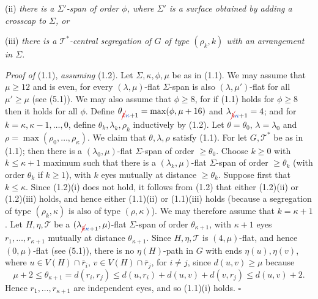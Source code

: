 \hspace*{12pt}(ii) \textit{there is a $\Sigma'$-span of order $\phi$, where $\Sigma'$ is a surface obtained by adding a crosscap to $\Sigma$, or}

\hspace*{12pt}(iii) \textit{there is a $\mathscr{T}^*$-central segregation of $G$ of type $(\rho_k, k)$ with an arrangement in $\Sigma$.}

\textit{Proof of} (1.1), \textit{assuming} (1.2). Let $\Sigma, \kappa, \phi, \mu$ be as in (1.1). We may assume that $\mu \ge 12$ and is even, for every $(\lambda, \mu)$-flat $\Sigma$-span is also $(\lambda, \mu')$-flat for all $\mu' \ge \mu$ (see (5.1)). We may also assume that $\phi \ge 8$, for if (1.1) holds for $\phi \ge 8$ then it holds for all $\phi$. Define $\theta_{\delm{k}\fix{\kappa}+1} = \max(\phi, \mu+16)$ and $\lambda_{\delm{k}\fix{\kappa}+1} = 4$; and for $k = \kappa, \kappa-1, \dots, 0$, define $\theta_k, \lambda_k, \rho_k$ inductively by (1.2). Let $\theta = \theta_0$, $\lambda = \lambda_0$ and $\rho = \max(\rho_0, \dots, \rho_\kappa)$. We claim that $\theta, \lambda, \rho$ satisfy (1.1). For let $G, \mathscr{T}^*$ be as in (1.1); then there is a $(\lambda_0, \mu)$-flat $\Sigma$-span of order $\ge \theta_0$. Choose $k \ge 0$ with $k \le \kappa+1$ maximum such that there is a $(\lambda_k, \mu)$-flat $\Sigma$-span of order $\ge \theta_k$ (with order $\theta_k$ if $k \ge 1$), with $k$ eyes mutually at distance $\ge \theta_k$. Suppose first that $k \le \kappa$. Since (1.2)(i) does not hold, it follows from (1.2) that either (1.2)(ii) or (1.2)(iii) holds, and hence either (1.1)(ii) or (1.1)(iii) holds (because a segregation of type $(\rho_k, \kappa)$ is also of type $(\rho, \kappa)$). We may therefore assume that $k = \kappa+1$. Let $H, \eta, \mathscr{T}$ be a $(\lambda_{\delm{k}\fix{\kappa}+1}, \mu)$-flat $\Sigma$-span of order $\theta_{\kappa+1}$, with $\kappa+1$ eyes $r_1, \dots, r_{\kappa+1}$ mutually at distance $\theta_{\kappa+1}$. Since $H, \eta, \mathscr{T}$ is $(4, \mu)$-flat, and hence $(0, \mu)$-flat (see (5.1)), there is no $\eta(H)$-path in $G$ with ends $\eta(u), \eta(v)$, where $u \in V(H) \cap \bar{r}_i$, $v \in V(H) \cap \bar{r}_j$, for $i \ne j$, since $d(u, v) \ge \mu$ because
\begin{equation*}
\mu+2 \le \theta_{\kappa+1} = d(r_i, r_j) \le d(u, r_i) + d(u, v) + d(v, r_j) \le d(u, v) + 2.
\end{equation*}
Hence $r_1, \dots, r_{\kappa+1}$ are independent eyes, and so (1.1)(i) holds. $\square$

